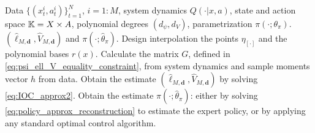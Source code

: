 \begin{algorithm}[!htpb]
    \caption{Estimation procedure for cost and policy}
    \label{alg:estimator}
    \begin{algorithmic}[1]
        \Require Data $\{(x_t^i,a_t^i)\}_{t=1}^N$, $i=1:M$, system dynamics $Q(\cdot|x,a)$, state and action space $\mathbb{K} = X\times A$, polynomial degrees $(d_\psi,d_V)$, parametrization $\pi(\cdot;\theta_\pi)$.
        \Ensure $(\hat{\ell}_{M,\mathbf{d}},\hat{V}_{M,\mathbf{d}})$ and $\pi(\cdot;\hat{\theta}_\pi)$.
        \State Design interpolation the points $\eta_{[\cdot]}$ and the polynomial bases $r(x)$.
        \State Calculate the matrix $G$, defined in \eqref{eq:psi_ell_V_equality_constraint}, from system dynamics and sample moments vector $h$ from data.
        \State Obtain the estimate $(\hat{\ell}_{M,\mathbf{d}},\hat{V}_{M,\mathbf{d}})$ by solving \eqref{eq:IOC_approx2}.
        \State Obtain the estimate $\pi(\cdot;\hat{\theta}_\pi)$: either by solving \eqref{eq:policy_approx_reconstruction} to estimate the expert policy, or by applying any standard optimal control algorithm.
    \end{algorithmic}
\end{algorithm} 


